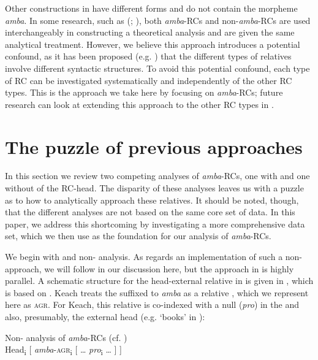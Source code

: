 \documentclass[output=paper
,newtxmath
,modfonts
,nonflat]{langsci/langscibook}
\begin{document}
Other  constructions in  have different forms and do not contain the morpheme \textit{amba}. In some research, such as \citeauthor{Ngonyani2001} (\citeyear{Ngonyani2001}; \citeyear{Ngonyani2006}), both \textit{amba}{}-RCs and non-\textit{amba}{}-RCs are used interchangeably in constructing a theoretical analysis and are given the same analytical treatment. However, we believe this approach introduces a potential confound, as it has been proposed (e.g. \citealt{Barrett-Keach1985}) that the different types of  relatives involve different syntactic structures. To avoid this potential confound, each type of RC can be investigated systematically and independently of the other RC types. This is the approach we take here by focusing on \textit{amba}{}-RCs; future research can look at extending this approach to the other RC types in . 

\section{The puzzle of previous approaches}\label{sec:gould:3}

In this section we review two competing analyses of \textit{amba}{}-RCs, one with and one without  of the RC-head. The disparity of these analyses leaves us with a puzzle as to how to analytically approach these relatives. It should be noted, though, that the different analyses are not based on the same core set of data. In this paper, we address this shortcoming by investigating a more comprehensive data set, which we then use as the foundation for our analysis of \textit{amba}{}-RCs.

We begin with  and  non- analysis. As regards an implementation of such a non- approach, we will follow \citet{Keach2004} in our discussion here, but the approach in \citet{Barrett-Keach1985} is highly parallel. A schematic structure for the head-external relative in  is given in , which is based on \citet[126]{Keach2004}. Keach treats the  suffixed to \textit{amba} as a relative , which we represent here as \textsc{agr}. For Keach, this relative  is co-indexed with a null  (\textit{pro}) in the  and also, presumably, the external head (e.g. ‘books’ in ):

\ea\label{ex:gould:2}
Non- analysis of \textit{amba}{}-RCs (cf. \citealt{Keach2004})\\
Head\textsubscript{i} [ \textit{amba}{}-\textsc{agr}\textsubscript{i} [ … \textit{pro}\textsubscript{i} … ] ]
\z
\end{document}
